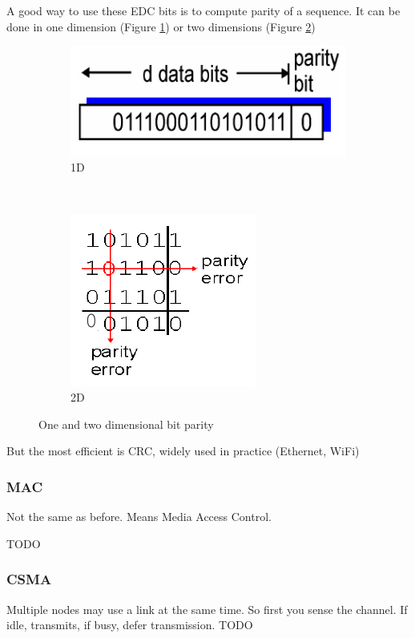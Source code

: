 \documentclass[12pt,a4paper]{article}
\begin{document}
A good way to use these EDC bits is to compute parity of a sequence. It can be done in one dimension (Figure \ref{subf : parity_1d}) or two dimensions (Figure \ref{subf : parity_2d})
\begin{figure}[h]
	\centering
	\begin{subfigure}[b]{0.45\textwidth}
		\centering
		\includegraphics[scale=0.5]{images/parity_1d}
		\caption{1D}
		\label{subf : parity_1d}
	\end{subfigure}~
	\begin{subfigure}[b]{0.45\textwidth}
		\centering
		\includegraphics[scale=0.5]{images/parity_2d}
		\caption{2D}
		\label{subf : parity_2d}
	\end{subfigure}
	\caption{One and two dimensional bit parity}
	\label{figs: bit parity}
\end{figure}

But the most efficient is CRC, widely used in practice (Ethernet, WiFi)

\subsubsection{MAC}
Not the same as before. Means Media Access Control.

TODO

\subsubsection{CSMA}
Multiple nodes may use a link at the same time. So first you sense the channel. If idle, transmits, if busy, defer transmission.
TODO
\end{document}

